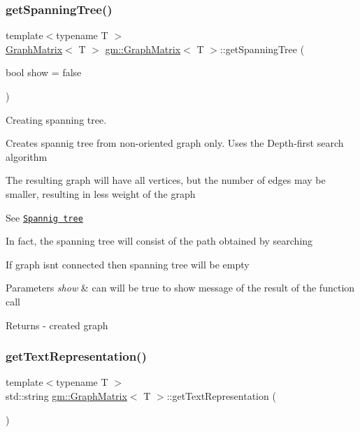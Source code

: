 \subsubsection{\texorpdfstring{get\+Spanning\+Tree()}{getSpanningTree()}}
{\footnotesize\ttfamily template$<$typename T $>$ \\
\mbox{\hyperlink{classgm_1_1_graph_matrix}{Graph\+Matrix}}$<$ T $>$ \mbox{\hyperlink{classgm_1_1_graph_matrix}{gm\+::\+Graph\+Matrix}}$<$ T $>$\+::get\+Spanning\+Tree (\begin{DoxyParamCaption}\item[{bool}]{show = {\ttfamily false} }\end{DoxyParamCaption})}



Creating spanning tree. 

Creates spannig tree from non-\/oriented graph only. Uses the Depth-\/first search algorithm

The resulting graph will have all vertices, but the number of edges may be smaller, resulting in less weight of the graph

See \href{https://en.wikipedia.org/wiki/Spanning_tree}{\tt Spannig tree}

In fact, the spanning tree will consist of the path obtained by searching

If graph isn\textquotesingle{}t connected then spanning tree will be empty 
\begin{DoxyParams}{Parameters}
{\em show} & can will be true to show message of the result of the function call \\
\hline
\end{DoxyParams}
\begin{DoxyReturn}{Returns}
-\/ created graph 
\end{DoxyReturn}
\mbox{\label{classgm_1_1_graph_matrix_a58ac0e38794e668383319945b3c59f08}} 
\subsubsection{\texorpdfstring{get\+Text\+Representation()}{getTextRepresentation()}}
{\footnotesize\ttfamily template$<$typename T $>$ \\
std\+::string \mbox{\hyperlink{classgm_1_1_graph_matrix}{gm\+::\+Graph\+Matrix}}$<$ T $>$\+::get\+Text\+Representation (\begin{DoxyParamCaption}{ }\end{DoxyParamCaption})}



